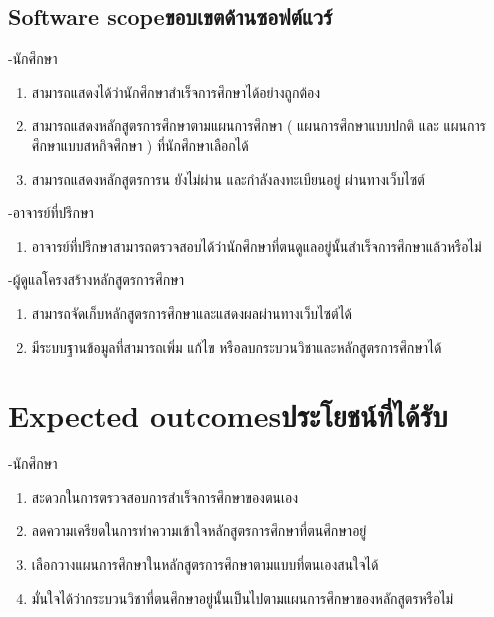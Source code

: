 
\subsection{\ifenglish Software scope\else ขอบเขตด้านซอฟต์แวร์\fi}

-นักศึกษา 

\begin{enumerate}
    \item สามารถแสดงได้ว่านักศึกษาสำเร็จการศึกษาได้อย่างถูกต้อง
    \item สามารถแสดงหลักสูตรการศึกษาตามแผนการศึกษา ( แผนการศึกษาแบบปกติ และ แผนการศึกษาแบบสหกิจศึกษา ) ที่นักศึกษาเลือกได้
    \item สามารถแสดงหลักสูตรการน ยังไม่ผ่าน และกำลังลงทะเบียนอยู่ ผ่านทางเว็บไซต์
\end{enumerate}

-อาจารย์ที่ปรึกษา 

\begin{enumerate}
    \item อาจารย์ที่ปรึกษาสามารถตรวจสอบได้ว่านักศึกษาที่ตนดูแลอยู่นั้นสำเร็จการศึกษาแล้วหรือไม่
\end{enumerate}

-ผู้ดูแลโครงสร้างหลักสูตรการศึกษา

\begin{enumerate}
    \item สามารถจัดเก็บหลักสูตรการศึกษาและแสดงผลผ่านทางเว็บไซต์ได้
    \item มีระบบฐานข้อมูลที่สามารถเพิ่ม แก้ไข หรือลบกระบวนวิชาและหลักสูตรการศึกษาได้
\end{enumerate}

\section{\ifenglish Expected outcomes\else ประโยชน์ที่ได้รับ\fi}
-นักศึกษา 

\begin{enumerate}
    \item สะดวกในการตรวจสอบการสำเร็จการศึกษาของตนเอง 
    \item ลดความเครียดในการทำความเข้าใจหลักสูตรการศึกษาที่ตนศึกษาอยู่ 
    \item เลือกวางแผนการศึกษาในหลักสูตรการศึกษาตามแบบที่ตนเองสนใจได้
    \item มั่นใจได้ว่ากระบวนวิชาที่ตนศึกษาอยู่นั้นเป็นไปตามแผนการศึกษาของหลักสูตรหรือไม่ 
    
\end{enumerate}

